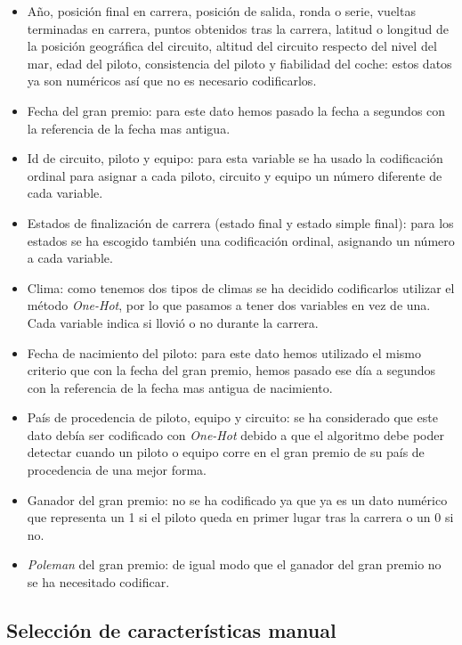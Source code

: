 \begin{itemize}
    \item Año, posición final en carrera, posición de salida, ronda o serie, vueltas terminadas en carrera, puntos obtenidos tras la carrera, latitud o longitud de la posición geográfica del circuito, altitud del circuito respecto del nivel del mar, edad del piloto, consistencia del piloto y fiabilidad del coche: estos datos ya son numéricos así que no es necesario codificarlos.
    \item Fecha del gran premio: para este dato hemos pasado la fecha a segundos con la referencia de la fecha mas antigua.
    \item Id de circuito, piloto y equipo: para esta variable se ha usado la codificación ordinal para asignar a cada piloto, circuito y equipo un número diferente de cada variable.
    \item Estados de finalización de carrera (estado final y estado simple final): para los estados se ha escogido también una codificación ordinal, asignando un número a cada variable.
    \item Clima: como tenemos dos tipos de climas se ha decidido codificarlos utilizar el método \textit{One-Hot}, por lo que pasamos a tener dos variables en vez de una. Cada variable indica si llovió o no durante la carrera.
    \item Fecha de nacimiento del piloto: para este dato hemos utilizado el mismo criterio que con la fecha del gran premio, hemos pasado ese día a segundos con la referencia de la fecha mas antigua de nacimiento.
    \item País de procedencia de piloto, equipo y circuito: se ha considerado que este dato debía ser codificado con \textit{One-Hot} debido a que el algoritmo debe poder detectar cuando un piloto o equipo corre en el gran premio de su país de procedencia de una mejor forma.
    \item Ganador del gran premio: no se ha codificado ya que ya es un dato numérico que representa un 1 si el piloto queda en primer lugar tras la carrera o un 0 si no.
    \item \textit{Poleman} del gran premio: de igual modo que el ganador del gran premio no se ha necesitado codificar.
\end{itemize}

\subsection{Selección de características manual}


